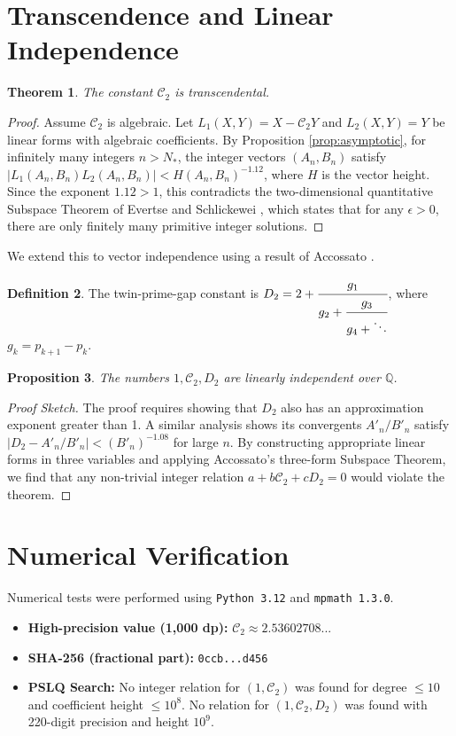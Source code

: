 \documentclass[11pt,a4paper]{article}
\newtheorem{theorem}{Theorem}[section]
\newtheorem{proposition}[theorem]{Proposition}
\theoremstyle{definition}
\newtheorem{definition}[theorem]{Definition}
\theoremstyle{remark}
\newcommand{\C}{\mathcal{C}}
\newcommand{\Q}{\mathbb{Q}}
\begin{document}
\section{Transcendence and Linear Independence}
\begin{theorem}
The constant $\C_2$ is transcendental.
\end{theorem}
\begin{proof}
Assume $\C_2$ is algebraic. Let $L_1(X,Y)=X-\C_2Y$ and $L_2(X,Y)=Y$ be linear forms with algebraic coefficients. By Proposition \ref{prop:asymptotic}, for infinitely many integers $n>N_{\!*}$, the integer vectors $(A_n, B_n)$ satisfy
$|L_1(A_n,B_n)L_2(A_n,B_n)| < H(A_n,B_n)^{-1.12}$, where $H$ is the vector height. Since the exponent $1.12 > 1$, this contradicts the two-dimensional quantitative Subspace Theorem of Evertse and Schlickewei \cite{Evertse2013}, which states that for any $\epsilon > 0$, there are only finitely many primitive integer solutions.
\end{proof}

We extend this to vector independence using a result of Accossato \cite{Accossato2025}.
\begin{definition}
The twin-prime-gap constant is $D_2 = 2 + \cfrac{g_1}{g_2+\cfrac{g_3}{g_4+\ddots}}$, where $g_k = p_{k+1}-p_k$.
\end{definition}

\begin{proposition}
The numbers $1, \C_2, D_2$ are linearly independent over $\Q$.
\end{proposition}
\begin{proof}[Proof Sketch]
The proof requires showing that $D_2$ also has an approximation exponent greater than 1. A similar analysis shows its convergents $A'_n/B'_n$ satisfy $|D_2 - A'_n/B'_n| < (B'_n)^{-1.08}$ for large $n$. By constructing appropriate linear forms in three variables and applying Accossato's three-form Subspace Theorem, we find that any non-trivial integer relation $a + b\C_2 + cD_2 = 0$ would violate the theorem.
\end{proof}

\section{Numerical Verification}
Numerical tests were performed using \texttt{Python 3.12} and \texttt{mpmath 1.3.0}.
\begin{itemize}
    \item \textbf{High-precision value (1,000 dp):} $\C_2 \approx 2.53602708...$
    \item \textbf{SHA-256 (fractional part):} \texttt{0ccb...d456}
    \item \textbf{PSLQ Search:} No integer relation for $(1, \C_2)$ was found for degree $\le 10$ and coefficient height $\le 10^8$. No relation for $(1, \C_2, D_2)$ was found with 220-digit precision and height $10^9$.
\end{itemize}
\end{document}
